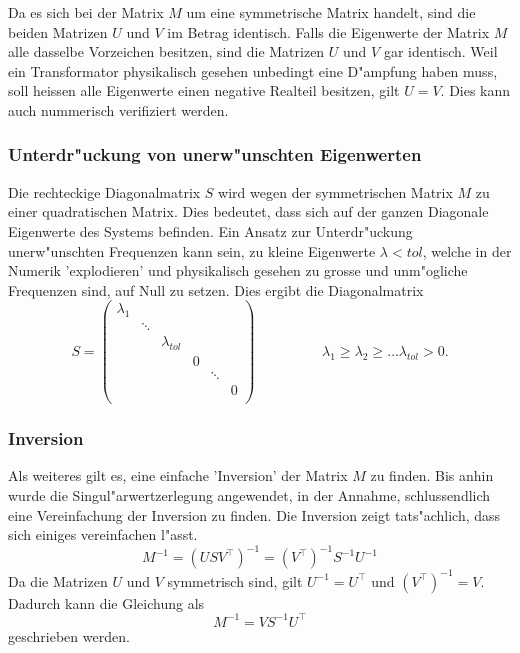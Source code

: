 \begin{refsection}
Da es sich bei der Matrix $M$ um eine symmetrische Matrix handelt, sind die beiden Matrizen $U$ und $V$ im Betrag identisch. Falls die Eigenwerte der Matrix $M$ alle dasselbe Vorzeichen besitzen, sind die Matrizen $U$ und $V$ gar identisch. Weil ein Transformator physikalisch gesehen unbedingt eine D"ampfung haben muss, soll heissen alle Eigenwerte einen negative Realteil besitzen, gilt $U = V$. Dies kann auch nummerisch verifiziert werden.

\subsubsection{Unterdr"uckung von unerw"unschten Eigenwerten}
Die rechteckige Diagonalmatrix $S$ wird wegen der symmetrischen Matrix $M$ zu einer quadratischen Matrix. Dies bedeutet, dass sich auf der ganzen Diagonale Eigenwerte des Systems befinden. Ein Ansatz zur Unterdr"uckung unerw"unschten Frequenzen kann sein, zu kleine Eigenwerte $\lambda < tol$, welche in der Numerik 'explodieren' und physikalisch gesehen zu grosse und unm"ogliche Frequenzen sind, auf Null zu setzen. Dies ergibt die Diagonalmatrix 
\begin{equation*}
	S = \left( 
			\begin{array}{cccccc}
				\lambda_1 & & & & & \\
				& \ddots & & & &  \\
				& & \lambda_{tol} & & & \\
				& & & 0 & & \\
				& & & & \ddots & \\
				& & & & & 0 \\				
				\end{array}
			\right) 
			\hspace{2cm}\lambda_1 \geq \lambda_2 \geq \dots \lambda_{tol} > 0. 
\end{equation*}

\subsubsection{Inversion}
Als weiteres gilt es, eine einfache 'Inversion' der Matrix $M$ zu finden. Bis anhin wurde die Singul"arwertzerlegung angewendet, in der Annahme, schlussendlich eine Vereinfachung der Inversion zu finden. Die Inversion zeigt tats"achlich, dass sich einiges vereinfachen l"asst.
\begin{equation*}
	M^{-1} = \left(USV^\top\right)^{-1} = \left(V^\top\right)^{-1} S^{-1} U^{-1}
\end{equation*}
Da die Matrizen $U$ und $V$ symmetrisch sind, gilt $U^{-1} = U^\top$ und $\left(V^\top\right)^{-1} = V$. Dadurch kann die Gleichung als 
\begin{equation*}
	M^{-1} = V S^{-1} U^\top
\end{equation*}
geschrieben werden.


\end{refsection}
